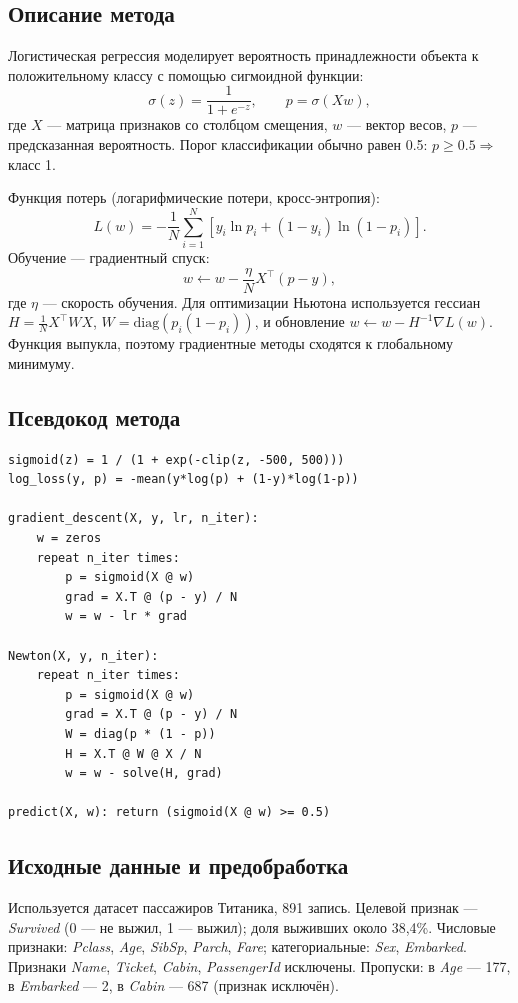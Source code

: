 \documentclass[12pt,a4paper]{article}
\begin{document}
\subsection{Описание метода}
Логистическая регрессия моделирует вероятность принадлежности объекта к положительному классу с помощью сигмоидной функции:
\begin{equation}
\sigma(z) = \frac{1}{1 + e^{-z}}, \qquad p = \sigma(Xw),
\end{equation}
где $X$ --- матрица признаков со столбцом смещения, $w$ --- вектор весов, $p$ --- предсказанная вероятность. Порог классификации обычно равен 0.5: $p \ge 0.5 \Rightarrow$ класс 1.

Функция потерь (логарифмические потери, кросс-энтропия):
\begin{equation}
L(w) = -\frac{1}{N}\sum_{i=1}^{N}\left[y_i\ln p_i + (1-y_i)\ln(1-p_i)\right].
\end{equation}
Обучение --- градиентный спуск:
\begin{equation}
w \leftarrow w - \frac{\eta}{N}X^\top(p-y),
\end{equation}
где $\eta$ --- скорость обучения. Для оптимизации Ньютона используется гессиан $H = \frac{1}{N}X^\top W X$, $W = \mathrm{diag}(p_i(1-p_i))$, и обновление $w \leftarrow w - H^{-1}\nabla L(w)$. Функция выпукла, поэтому градиентные методы сходятся к глобальному минимуму.

\subsection{Псевдокод метода}
\begin{lstlisting}
sigmoid(z) = 1 / (1 + exp(-clip(z, -500, 500)))
log_loss(y, p) = -mean(y*log(p) + (1-y)*log(1-p))

gradient_descent(X, y, lr, n_iter):
    w = zeros
    repeat n_iter times:
        p = sigmoid(X @ w)
        grad = X.T @ (p - y) / N
        w = w - lr * grad

Newton(X, y, n_iter):
    repeat n_iter times:
        p = sigmoid(X @ w)
        grad = X.T @ (p - y) / N
        W = diag(p * (1 - p))
        H = X.T @ W @ X / N
        w = w - solve(H, grad)

predict(X, w): return (sigmoid(X @ w) >= 0.5)
\end{lstlisting}

\subsection{Исходные данные и предобработка}
Используется датасет пассажиров Титаника, 891 запись. Целевой признак --- \emph{Survived} (0 --- не выжил, 1 --- выжил); доля выживших около 38,4\%. Числовые признаки: \emph{Pclass}, \emph{Age}, \emph{SibSp}, \emph{Parch}, \emph{Fare}; категориальные: \emph{Sex}, \emph{Embarked}. Признаки \emph{Name}, \emph{Ticket}, \emph{Cabin}, \emph{PassengerId} исключены. Пропуски: в \emph{Age} --- 177, в \emph{Embarked} --- 2, в \emph{Cabin} --- 687 (признак исключён).
\end{document}
